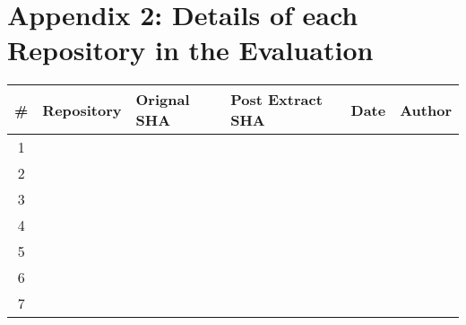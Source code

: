 \section{Appendix 2: Details of each Repository in the Evaluation}
\label{sec:appendix2_details_of_each_repository}

\begin{table}[ht]
    \begin{tabular}{c|lllll}
    \hline
    \multicolumn{1}{|c|}{\#} & \multicolumn{1}{l|}{\textbf{Repository}} & \multicolumn{1}{l|}{\textbf{Orignal SHA}} & \multicolumn{1}{l|}{\textbf{Post Extract SHA}} & \multicolumn{1}{l|}{\textbf{Date}} & \multicolumn{1}{l|}{\textbf{Author}} \\ \hline
    1                        &                                          & \textbf{}                                 &                                                &                                    &                                      \\
    2                        &                                          &                                           &                                                &                                    &                                      \\
    3                        &                                          &                                           &                                                &                                    &                                      \\
    4                        &                                          &                                           &                                                &                                    &                                      \\
    5                        &                                          &                                           &                                                &                                    &                                      \\
    6                        &                                          &                                           &                                                &                                    &                                      \\
    7                        &                                          &                                           &                                                &                                    &                                      \\

\end{tabular}
\end{table}
